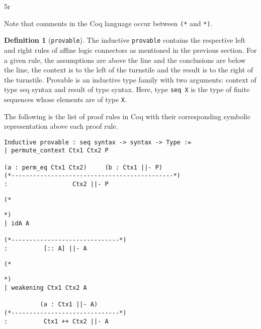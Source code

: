5r\documentclass{article}
\theoremstyle{definition}
\newtheorem{defn}{Definition}
\begin{document}
Note that comments in the Coq language occur between \verb|(*| and \verb|*)|.

\begin{defn}[\texttt{provable}]
The inductive \verb|provable| contains the respective left and right rules of affine logic connectors as mentioned in the previous section. For a given rule, the assumptions are above the line and the conclusions are below the line, the context is to the left of the turnstile and the result is to the right of the turnstile. Provable is an inductive type family with two arguments: context of type seq syntax and result of type syntax. Here, type \verb|seq X| is the type of finite sequences whose elements are of type \verb|X|.
\end{defn}

The following is the list of proof rules in Coq with their corresponding symbolic representation above each proof rule.

\begin{verbatim}
Inductive provable : seq syntax -> syntax -> Type :=
| permute_context Ctx1 Ctx2 P 

(a : perm_eq Ctx1 Ctx2)     (b : Ctx1 ||- P)
(*---------------------------------------------*)
:                  Ctx2 ||- P

\end{verbatim}
\noindent\begin{minipage}{\textwidth}
\begin{verbatim}
(*
\end{verbatim}
\begin{center}\usebox{\idRule}\end{center}
\begin{verbatim}
*)
| idA A

(*------------------------------*)
:          [:: A] ||- A
\end{verbatim}
\end{minipage}

\noindent\begin{minipage}{\textwidth}
\begin{verbatim}
(*
\end{verbatim}
\begin{center}\usebox{\weakening}\end{center}
\begin{verbatim}
*)
| weakening Ctx1 Ctx2 A

          (a : Ctx1 ||- A)
(*------------------------------*)
:          Ctx1 ++ Ctx2 ||- A
\end{verbatim}
\end{minipage}
\end{document}
